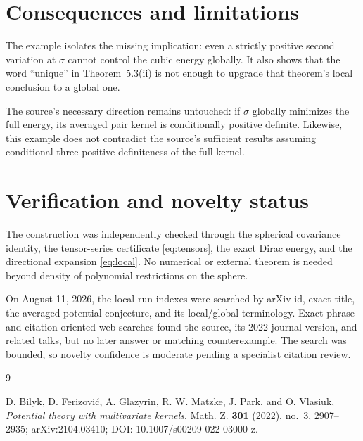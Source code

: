 \documentclass[11pt]{article}
\begin{document}
\section{Consequences and limitations}

The example isolates the missing implication: even a strictly positive second
variation at $\sigma$ cannot control the cubic energy globally.  It also shows
that the word ``unique'' in Theorem~5.3(ii) is not enough to upgrade that
theorem's local conclusion to a global one.

The source's necessary direction remains untouched: if $\sigma$ globally
minimizes the full energy, its averaged pair kernel is conditionally positive
definite.  Likewise, this example does not contradict the source's sufficient
results assuming conditional three-positive-definiteness of the full kernel.

\section{Verification and novelty status}

The construction was independently checked through the spherical covariance
identity, the tensor-series certificate \eqref{eq:tensors}, the exact Dirac
energy, and the directional expansion \eqref{eq:local}.  No numerical or
external theorem is needed beyond density of polynomial restrictions on the
sphere.

On August 11, 2026, the local run indexes were searched by arXiv id, exact
title, the averaged-potential conjecture, and its local/global terminology.
Exact-phrase and citation-oriented web searches found the source, its 2022
journal version, and related talks, but no later answer or matching
counterexample.  The search was bounded, so novelty confidence is moderate
pending a specialist citation review.

\begin{thebibliography}{9}

D. Bilyk, D. Ferizovi\'c, A. Glazyrin, R. W. Matzke, J. Park, and O. Vlasiuk,
\emph{Potential theory with multivariate kernels},
Math. Z. \textbf{301} (2022), no.~3, 2907--2935;
arXiv:2104.03410; DOI: 10.1007/s00209-022-03000-z.

\end{thebibliography}
\end{document}
